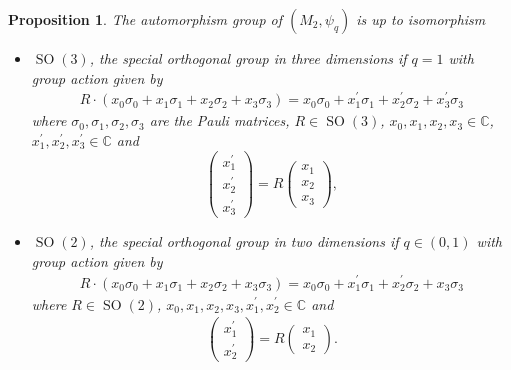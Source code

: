 \documentclass{amsart}
\newtheorem{proposition}[thm]{Proposition}
\newcommand{\C}{\mathbb{C}}
\DeclareMathOperator{\SO}{SO}
\begin{document}
\begin{proposition}
\label{pre::prop:aut_group_of_(M2,psi)}    
    The automorphism group of $(M_2, \psi_q)$ is up to isomorphism
    \begin{itemize}
        \item $\SO(3)$, the special orthogonal group in three dimensions if $q=1$ with group action given by
        \begin{align*}
            R \cdot (x_0 \sigma_0 + x_1 \sigma_1 + x_2 \sigma_2 + x_3 \sigma_3) = x_0 \sigma_0 + x_1^\prime \sigma_1 + x_2^\prime \sigma_2 + x_3^\prime \sigma_3
        \end{align*}
        where $\sigma_0, \sigma_1, \sigma_2, \sigma_3$ are the Pauli matrices, $R \in \SO(3)$, $x_0, x_1, x_2, x_3 \in \C$, $x_1^\prime, x_2^\prime, x_3^\prime \in \C$ and 
        $$
        \begin{pmatrix}
            x_1^\prime \\ x_2^\prime \\ x_3^\prime
        \end{pmatrix}
        = R \begin{pmatrix}
            x_1 \\ x_2 \\ x_3
        \end{pmatrix},
        $$
        \item $\SO(2)$, the special orthogonal group in two dimensions if $q\in(0,1)$ with group action given by
        \begin{align*}
            R \cdot (x_0 \sigma_0 + x_1 \sigma_1 + x_2 \sigma_2 + x_3 \sigma_3) = x_0 \sigma_0 + x_1^\prime \sigma_1 + x_2^\prime \sigma_2 + x_3 \sigma_3
        \end{align*}
        where $R \in \SO(2)$, $x_0, x_1, x_2, x_3, x_1^\prime, x_2^\prime \in \C$ and 
        \begin{align*}
            \begin{pmatrix}
                x_1^\prime \\ x_2^\prime
            \end{pmatrix}
            = R
            \begin{pmatrix}
                x_1 \\ x_2
            \end{pmatrix}.
        \end{align*}
    \end{itemize}
\end{proposition}
\end{document}
